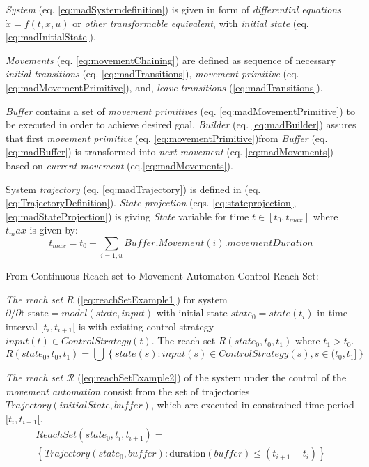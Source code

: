 \begin{definition}
    \noindent \emph{System} (eq. \ref{eq:madSystemdefinition}) is given in form of \emph{differential equations} $\dot{x} = f(t,x,u)$ or \emph{other transformable equivalent}, with \emph{initial state} (eq. \ref{eq:madInitialState}).
    
    \emph{Movements} (eq. \ref{eq:movementChaining}) are defined as sequence of necessary \emph{initial transitions} (eq. \ref{eq:madTransitions}), \emph{movement primitive} (eq. \ref{eq:madMovementPrimitive}), and, \emph{leave transitions} (\ref{eq:madTransitions}).
    
    \emph{Buffer} contains a set of \emph{movement primitives} (eq. \ref{eq:madMovementPrimitive}) to be executed in order to achieve desired goal. \emph{Builder} (eq. \ref{eq:madBuilder}) assures that first \emph{movement primitive} (eq. \ref{eq:movementPrimitive})from \emph{Buffer} (eq. \ref{eq:madBuffer}) is transformed into \emph{next movement} (eq. \ref{eq:madMovements}) based on \emph{current movement} (eq.\ref{eq:madMovements}).
    
    System \emph{trajectory} (eq. \ref{eq:madTrajectory}) is defined in (eq. \ref{eq:TrajectoryDefinition}). \emph{State projection} (eqs. \ref{eq:stateprojection},\ref{eq:madStateProjection}) is giving \emph{State} variable for time $t\in[t_0,t_{max}]$ where $t_max$ is given by:
    \begin{equation}
    t_{max}=t_0+\sum_{i=1,u}Buffer.Movement(i).movementDuration    
    \end{equation}
    \end{definition}
    
    \begin{note}{From Continuous Reach set to Movement Automaton Control Reach Set:}\label{eq:fromContRStoMARS}

\emph{The reach set $R$} (\ref{eq:reachSetExample1}) for system $\partial/\partial \text{t state} =model(state,input)$ with initial state $state_0=state(t_i)$ in time interval $[t_i,t_{i+1}[$  is with existing control strategy $input(t)\in Control Strategy(t)$. The reach set $R(state_0, t_0,t_1)$ where $t_1 > t_0$.
\begin{equation}\label{eq:reachSetExample1}
    R(state_0, t_0,t_1) = \bigcup \left\{state(s):input(s)\in Control Strategy(s), s\in (t_0,t_1]\right\} 
\end{equation}


\noindent\emph{The reach set $\mathscr{R}$} (\ref{eq:reachSetExample2}) of the system under the control of the \emph{movement automation} consist from the set of trajectories $Trajectory(initialState,buffer)$, which are executed in constrained time period $[t_i,t_{i+1}[$.
\begin{multline}\label{eq:reachSetExample2}
     ReachSet(state_0,t_i,t_{i+1})=\\\left\{Trajectory(state_0,buffer):\text{duration}(buffer) \le (t_{i+1}-t_i)\right\}
\end{multline}
\end{note}

